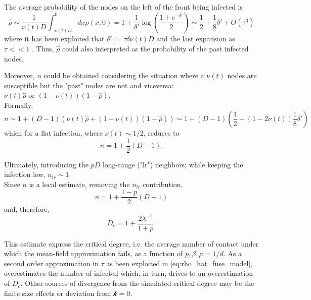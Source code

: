 \documentclass[a4paper,10pt]{book} %
\theoremstyle{definition}
\begin{document}
The average probability of the nodes on the left of the front being infected is
\begin{equation}
	\hat{\rho} \sim \frac{1}{\nu(t) D} \int_{-\nu(t) D}^{0} dx \rho(x,0) = 1+ \frac{1}{\delta'} \log( \frac{1+e^{-\delta'}}{2} )
	\sim \frac{1}{2} + \frac{1}{8} \delta' + O(\tau^3) 
	\label{eq:rho_hat_fuse_model}
\end{equation}
where it has been exploited that $\delta':=\tau \delta \nu(t) D$ and the last expansion as $\tau<<1$ \cite{Thurner::Appendix_NetBasedExpl}. Thus, $\hat{\rho}$ could also interpreted as the probability of the past infected nodes.

Moreover, $n$ could be obtained considering the situation where a $\nu(t)$ nodes are susceptible but the "past" nodes are not and viceversa: $\nu(t) \hat{\rho} \text{ or } (1-\nu(t))(1- \hat{\rho})$. 
\\Formally,
\begin{equation}
	n \sim 1+ (D-1)(\nu(t)\hat{\rho}+(1-\nu(t))(1-\hat{\rho}))
	\sim 1+ (D-1)(\frac{1}{2} - (1-2\nu(t)) \frac{1}{8} \delta')
\end{equation}
which for a flat infection, where $\nu(t)\sim 1/2$, reduces to
\begin{equation}
	n = 1 + \frac{1}{2}(D-1).
\end{equation} 

Ultimately, introducing the $pD$ long-range ("lr") neighbors; while keeping the infection low, $n_{lr} \sim 1$.
\\Since $n$ is a local estimate, removing the $n_{lr}$ contribution,
\begin{equation}
	n = 1 + \frac{1-p}{2}(D-1)
\end{equation}   
and, therefore,
\begin{equation}
	D_c = 1+ \frac{2 \lambda^{-1}}{1+p}.
	\label{eq:final_D_c_fuse_network}
\end{equation}

This estimate express the critical degree, i.e. the average number of contact under which the mean-field approximation fails, as a function of $p,\beta,\mu = 1/d$. As a second order approximation in $\tau$ as been exploited in \autoref{eq:rho_hat_fuse_model}, overestimates the number of infected which, in turn, drives to an overestimation of $D_c$. Other sources of divergence from the simulated critical degree may be the finite size effects or deviation from $\mathcal{k} = 0$.
\end{document}
